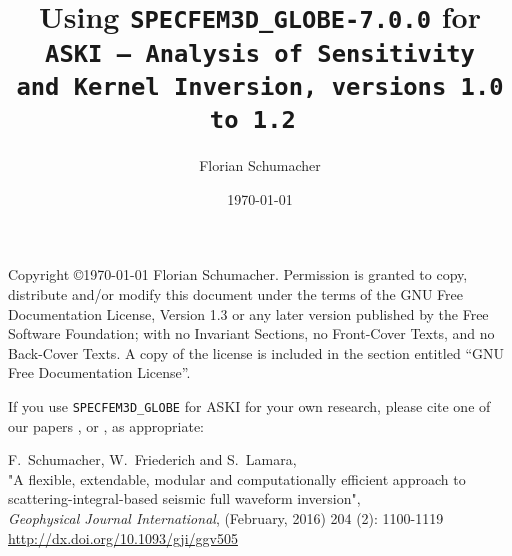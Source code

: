 \documentclass[12pt,a4paper]{article}
\newcommand{\lcode}[1]{\nolinkurl{#1}}
\newcommand{\ASKI}{ {\ttfamily ASKI} }
\begin{document}
\sloppy
%
\setlength{\parindent}{0cm}
\addtolength{\parskip}{0.5em}
%
%
%
\title{Using {\tt \Huge SPECFEM3D\_GLOBE-7.0.0} for \\ \tt {\Huge ASKI} {\rm--} {\Huge A}{\large nalysis of} {\Huge S}{\large ensitivity \\ and} {\Huge\tt K}{\large ernel} {\Huge\tt I}{\large nversion, versions 1.0 to 1.2} }
\author[1]{Florian Schumacher}
\date{\mydate \today}
\maketitle
%
Copyright \copyright {\myyear \today} Florian Schumacher.
Permission is granted to copy, distribute and/or modify this document
under the terms of the GNU Free Documentation License, Version 1.3
or any later version published by the Free Software Foundation;
with no Invariant Sections, no Front-Cover Texts, and no Back-Cover Texts.
A copy of the license is included in the section entitled ``GNU
Free Documentation License''.

\vspace{1cm}

If you use \lcode{SPECFEM3D_GLOBE} for \ASKI{} for your own research, please cite 
one of our papers \cite{Schumacher16}, or \cite{Schumacher16b}, as appropriate:

F.\ Schumacher, W.\ Friederich and S.\ Lamara, \\
"A flexible, extendable, modular and 
computationally efficient approach to scattering-integral-based seismic full waveform 
inversion", \\
\emph{Geophysical Journal International}, (February, 2016) 204 (2): 1100-1119\\
\url{http://dx.doi.org/10.1093/gji/ggv505}
\end{document}
